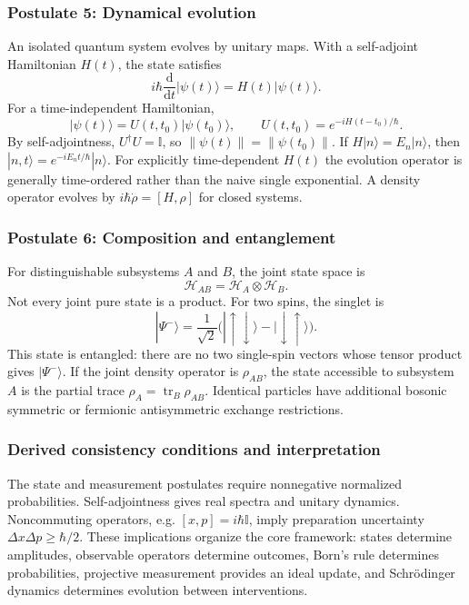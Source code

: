 \documentclass[11pt,a4paper]{article}
\newcommand{\dd}{\mathrm{d}}
\newcommand{\Hil}{\mathcal H}
\newcommand{\id}{\mathbb I}
\newcommand{\tr}{\operatorname{tr}}
\begin{document}
\subsubsection{Postulate 5: Dynamical evolution}
An isolated quantum system evolves by unitary maps. With a self-adjoint Hamiltonian $H(t)$, the state satisfies
\begin{equation}
\boxed{i\hbar\frac{\dd}{\dd t}|\psi(t)\rangle=H(t)|\psi(t)\rangle}.
\end{equation}
For a time-independent Hamiltonian,
\begin{equation}
\boxed{|\psi(t)\rangle=U(t,t_0)|\psi(t_0)\rangle},\qquad
\boxed{U(t,t_0)=e^{-iH(t-t_0)/\hbar}}.
\end{equation}
By self-adjointness, $U^\dagger U=\id$, so $\|\psi(t)\|=\|\psi(t_0)\|$. If $H|n\rangle=E_n|n\rangle$, then $|n,t\rangle=e^{-iE_nt/\hbar}|n\rangle$. For explicitly time-dependent $H(t)$ the evolution operator is generally time-ordered rather than the naive single exponential. A density operator evolves by $i\hbar\dot\rho=[H,\rho]$ for closed systems.

\subsubsection{Postulate 6: Composition and entanglement}
For distinguishable subsystems $A$ and $B$, the joint state space is
\begin{equation}
\boxed{\Hil_{AB}=\Hil_A\otimes\Hil_B}.
\end{equation}
Not every joint pure state is a product. For two spins, the singlet is
\begin{equation}
\boxed{|\Psi^-\rangle=\frac{1}{\sqrt2}\big(|\uparrow\downarrow\rangle-|\downarrow\uparrow\rangle\big)}.
\end{equation}
This state is entangled: there are no two single-spin vectors whose tensor product gives $|\Psi^-\rangle$. If the joint density operator is $\rho_{AB}$, the state accessible to subsystem $A$ is the partial trace $\rho_A=\tr_B\rho_{AB}$. Identical particles have additional bosonic symmetric or fermionic antisymmetric exchange restrictions.

\subsubsection{Derived consistency conditions and interpretation}
The state and measurement postulates require nonnegative normalized probabilities. Self-adjointness gives real spectra and unitary dynamics. Noncommuting operators, e.g. $[x,p]=i\hbar\id$, imply preparation uncertainty $\Delta x\Delta p\ge\hbar/2$. These implications organize the core framework: states determine amplitudes, observable operators determine outcomes, Born's rule determines probabilities, projective measurement provides an ideal update, and Schr\"odinger dynamics determines evolution between interventions.
\end{document}

